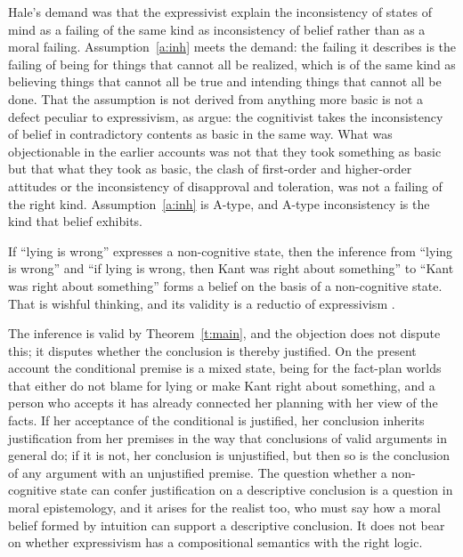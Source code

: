 \documentclass{situationist-preprint}
\begin{document}
\begin{reply}
Hale's demand was that the expressivist explain the inconsistency of states of mind as a failing of the same kind as inconsistency of belief rather than as a moral failing. Assumption~\ref{a:inh} meets the demand: the failing it describes is the failing of being for things that cannot all be realized, which is of the same kind as believing things that cannot all be true and intending things that cannot all be done. That the assumption is not derived from anything more basic is not a defect peculiar to expressivism, as \citet{BakerWoods2015} argue: the cognitivist takes the inconsistency of belief in contradictory contents as basic in the same way. What was objectionable in the earlier accounts was not that they took something as basic but that what they took as basic, the clash of first-order and higher-order attitudes or the inconsistency of disapproval and toleration, was not a failing of the right kind. Assumption~\ref{a:inh} is A-type, and A-type inconsistency is the kind that belief exhibits.
\end{reply}

\begin{objection}
If \enquote{lying is wrong} expresses a non-cognitive state, then the inference from \enquote{lying is wrong} and \enquote{if lying is wrong, then Kant was right about something} to \enquote{Kant was right about something} forms a belief on the basis of a non-cognitive state. That is wishful thinking, and its validity is a reductio of expressivism \citep{Dorr2002}.
\end{objection}

\begin{reply}
The inference is valid by Theorem~\ref{t:main}, and the objection does not dispute this; it disputes whether the conclusion is thereby justified. On the present account the conditional premise is a mixed state, being for the fact-plan worlds that either do not blame for lying or make Kant right about something, and a person who accepts it has already connected her planning with her view of the facts. If her acceptance of the conditional is justified, her conclusion inherits justification from her premises in the way that conclusions of valid arguments in general do; if it is not, her conclusion is unjustified, but then so is the conclusion of any argument with an unjustified premise. The question whether a non-cognitive state can confer justification on a descriptive conclusion is a question in moral epistemology, and it arises for the realist too, who must say how a moral belief formed by intuition can support a descriptive conclusion. It does not bear on whether expressivism has a compositional semantics with the right logic.
\end{reply}
\end{document}
